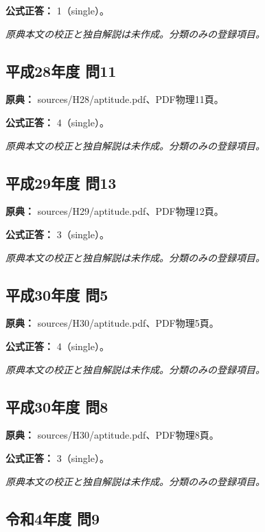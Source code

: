 \textbf{公式正答：} 1（single）。

\par\textit{原典本文の校正と独自解説は未作成。分類のみの登録項目。}

\subsection{平成28年度 問11}
\label{q:h28-reg-apt-11}

\noindent\textbf{原典：} sources/H28/aptitude.pdf、PDF物理11頁。

\textbf{公式正答：} 4（single）。

\par\textit{原典本文の校正と独自解説は未作成。分類のみの登録項目。}

\subsection{平成29年度 問13}
\label{q:h29-reg-apt-13}

\noindent\textbf{原典：} sources/H29/aptitude.pdf、PDF物理12頁。

\textbf{公式正答：} 3（single）。

\par\textit{原典本文の校正と独自解説は未作成。分類のみの登録項目。}

\subsection{平成30年度 問5}
\label{q:h30-reg-apt-05}

\noindent\textbf{原典：} sources/H30/aptitude.pdf、PDF物理5頁。

\textbf{公式正答：} 4（single）。

\par\textit{原典本文の校正と独自解説は未作成。分類のみの登録項目。}

\subsection{平成30年度 問8}
\label{q:h30-reg-apt-08}

\noindent\textbf{原典：} sources/H30/aptitude.pdf、PDF物理8頁。

\textbf{公式正答：} 3（single）。

\par\textit{原典本文の校正と独自解説は未作成。分類のみの登録項目。}

\subsection{令和4年度 問9}
\label{q:r04-reg-apt-09}

